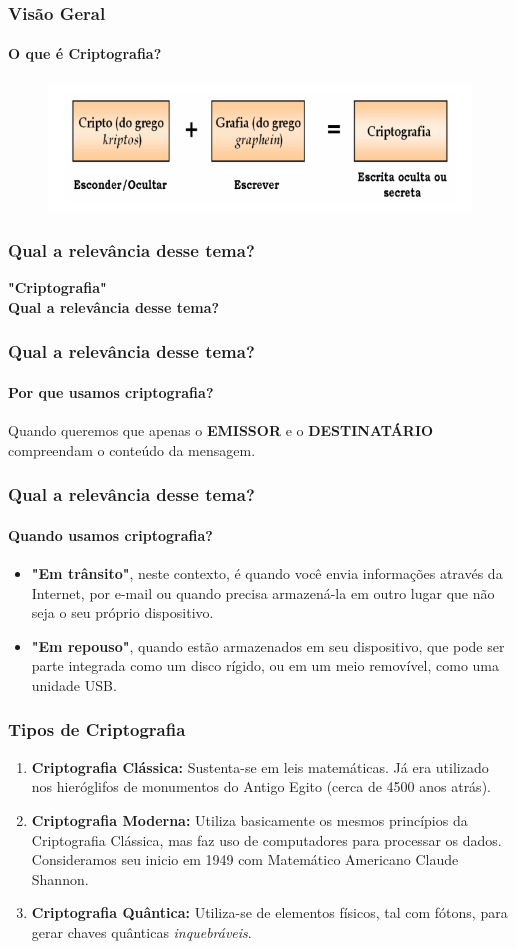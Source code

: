 \documentclass[compress]{beamer}
\begin{document}
\begin{frame}
\frametitle{Visão Geral}
\framesubtitle{O que é Criptografia?}
	\begin{figure}[h]
		\includegraphics[width=\textwidth]{pics/cripto_1}
	\end{figure}
\end{frame}

\begin{frame}
\frametitle{Qual a relevância desse tema?}
	\centering
	\textbf{\LARGE "Criptografia"}\\
	\textbf{\LARGE Qual a relevância desse tema?}
\end{frame}

\begin{frame}
	\frametitle{Qual a relevância desse tema?}
	\framesubtitle{Por que usamos criptografia?}
	\centering
		Quando queremos que apenas o \textbf{EMISSOR} e o \textbf{DESTINATÁRIO} compreendam o conteúdo da mensagem.
\end{frame}

\begin{frame}
\frametitle{Qual a relevância desse tema?}
\framesubtitle{Quando usamos criptografia?}
	\begin{itemize}
		\justifying
		\item<+->{\textbf{"Em trânsito"}, neste contexto, é quando você envia informações através da Internet, por e-mail ou quando precisa armazená-la em outro lugar que não seja o seu próprio dispositivo.}
		\item<+->{\textbf{"Em repouso"}, quando estão armazenados em seu dispositivo, que pode ser parte integrada como um disco rígido, ou em um meio removível, como uma unidade USB.}
	\end{itemize}
\end{frame}

\begin{frame}
\frametitle{Tipos de Criptografia}
\begin{enumerate}
	\justifying
	\item<+->{\textbf{Criptografia Clássica:} Sustenta-se em leis matemáticas. Já era utilizado nos hieróglifos de monumentos do Antigo Egito (cerca de 4500 anos atrás).}
	\item<+->{\textbf{Criptografia Moderna:} Utiliza basicamente os mesmos princípios da Criptografia Clássica, mas faz uso de computadores para processar os dados. Consideramos seu inicio em 1949 com Matemático Americano Claude Shannon.}
	\item<+->{\textbf{Criptografia Quântica:} Utiliza-se de elementos físicos, tal com fótons, para gerar chaves quânticas \emph{inquebráveis}.}
\end{enumerate}
\end{frame}
\end{document}
